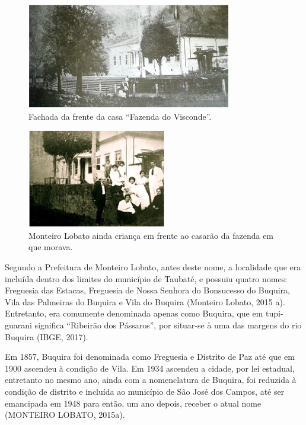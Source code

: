 \begin{figure}[h!]
	\centering
	\includegraphics[width=0.8\linewidth]{produtos/proddois/image18}
	\caption{Fachada da frente da casa “Fazenda do Visconde”.}
	\label{fig:image18}
\end{figure}

\begin{figure}[h!]
	\centering
	\includegraphics[width=0.8\linewidth]{produtos/proddois/image19}
	\caption{Monteiro Lobato ainda criança em frente ao casarão da fazenda em que morava.}
	\label{fig:image19}
\end{figure}

Segundo a Prefeitura de Monteiro Lobato, antes deste nome, a localidade que era incluída dentro dos limites do município de Taubaté, e possuiu quatro nomes: Freguesia das Estacas, Freguesia de Nossa Senhora do Bonsucesso do Buquira, Vila das Palmeiras do Buquira e Vila do Buquira (Monteiro Lobato, 2015 a). Entretanto, era comumente denominada apenas como Buquira, que em tupi-guarani significa “Ribeirão dos Pássaros”, por situar-se à uma das margens do rio Buquira (IBGE, 2017).

Em 1857, Buquira foi denominada como Freguesia e Distrito de Paz até que em 1900 ascendeu à condição de Vila. Em 1934 ascendeu a cidade, por lei estadual, entretanto no mesmo ano, ainda com a nomenclatura de Buquira, foi reduzida à condição de distrito e incluída ao município de São José dos Campos, até ser emancipada em 1948 para então, um ano depois, receber o atual nome (MONTEIRO LOBATO, 2015a).

